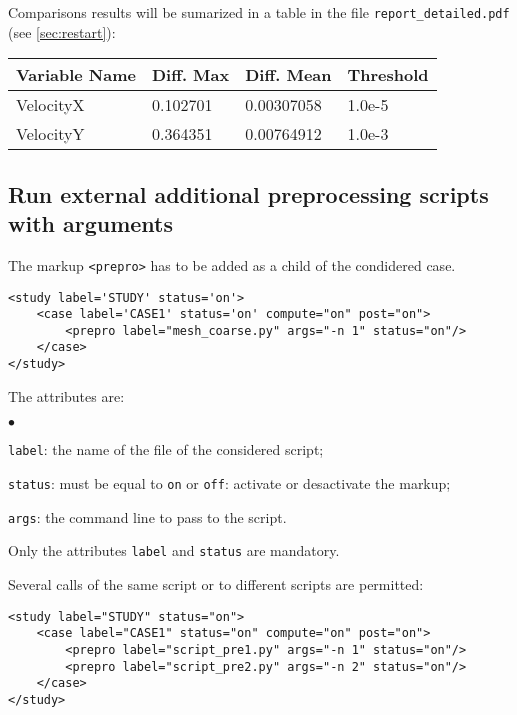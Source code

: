 \documentclass[a4paper,10pt,twoside]{csshortdoc}
\begin{document}
Comparisons results will be sumarized in a table in the file
\texttt{report\_detailed.pdf}  (see \ref{sec:restart}):

\begin{center}
\begin{longtable}{|l|l|l|l|}
\hline
\textbf{Variable Name} &\textbf{Diff. Max} &\textbf{Diff. Mean} &\textbf{Threshold} \\
\hline
\hline
VelocityX &0.102701 &0.00307058 &1.0e-5 \\
\hline
VelocityY &0.364351 &0.00764912 &1.0e-3 \\
\hline
\end{longtable}
\end{center}

\subsection{Run external additional preprocessing scripts with arguments}

The markup \texttt{<prepro>} has to be added as a child of the condidered case.

\small
\begin{verbatim}
<study label='STUDY' status='on'>
    <case label='CASE1' status='on' compute="on" post="on">
        <prepro label="mesh_coarse.py" args="-n 1" status="on"/>
    </case>
</study>
\end{verbatim}
\normalsize

The attributes are:
\begin{list}{$\bullet$}{}
\item \texttt{label}: the name of the file of the considered script;
\item \texttt{status}: must be equal to \texttt{on} or \texttt{off}:
activate or desactivate the markup;
\item \texttt{args}: the command line to pass to the script.
\end{list}

Only the attributes \texttt{label} and \texttt{status} are mandatory.

Several calls of the same script or to different scripts are permitted:
\small
\begin{verbatim}
<study label="STUDY" status="on">
    <case label="CASE1" status="on" compute="on" post="on">
        <prepro label="script_pre1.py" args="-n 1" status="on"/>
        <prepro label="script_pre2.py" args="-n 2" status="on"/>
    </case>
</study>
\end{verbatim}
\normalsize
\end{document}
